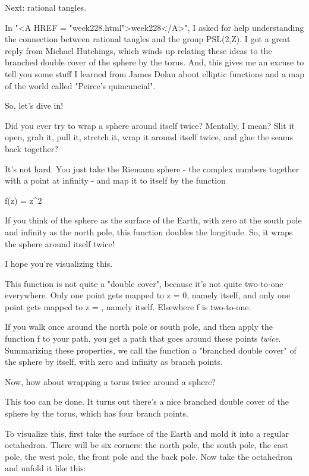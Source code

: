 Next: rational tangles.

In "<A HREF = "week228.html">week228</A>", I asked for help understanding the connection between
rational tangles and the group PSL(2,Z).  I got a great reply from
Michael Hutchings, which winds up relating these ideas to the branched
double cover of the sphere by the torus.  And, this gives me an excuse 
to tell you some stuff I learned from James Dolan about elliptic functions 
and a map of the world called "Peirce's quincuncial".   

So, let's dive in!

Did you ever try to wrap a sphere around itself twice?  Mentally,
I mean?  Slit it open, grab it, pull it, stretch it, wrap it around 
itself twice, and glue the seams back together?

It's not hard.  You just take the Riemann sphere - the complex 
numbers together with a point at infinity - and map it to itself 
by the function

f(z) = z^{2}

If you think of the sphere as the surface of the Earth, with zero 
at the south pole and infinity as the north pole, this function doubles 
the longitude.  So, it wraps the sphere around itself twice!   

I hope you're visualizing this.

This function is not quite a "double cover", because it's not quite 
two-to-one everywhere.  Only one point gets mapped to z = 0, namely 
itself, and only one point gets mapped to z = \infty , namely itself.  
Elsewhere f is two-to-one.   

If you walk once around the north pole or south pole, and then apply 
the function f to your path, you get a path that goes around these 
points \emph{twice}.   Summarizing these properties, we call the function 
a "branched double cover" of the sphere by itself, with zero and 
infinity as branch points.  

Now, how about wrapping a torus twice around a sphere?  

This too can be done.  It turns out there's a nice branched double 
cover of the sphere by the torus, which has four branch points.

To visualize this, first take the surface of the Earth and mold it 
into a regular octahedron.  There will be six corners: the north pole, 
the south pole, the east pole, the west pole, the front pole and the 
back pole.  Now take the octahedron and unfold it like this:

